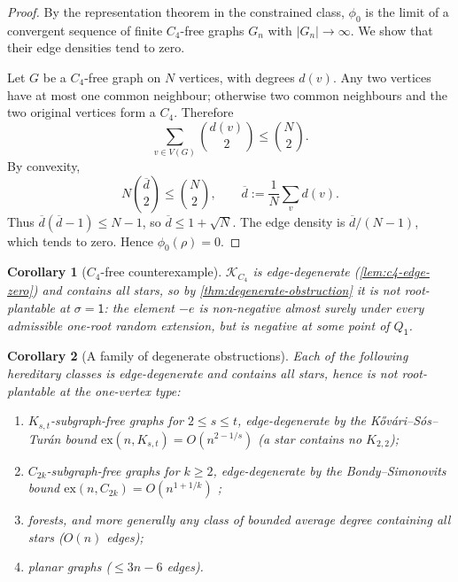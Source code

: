 \documentclass[11pt]{article}
\newtheorem{corollary}[corollary]{Corollary}
\theoremstyle{definition}
\newcommand{\K}{\mathcal{K}}
\newcommand{\vtype}{\mathsf{1}}
\begin{document}
\begin{proof}
By the representation theorem in the constrained class, $\phi_0$ is the limit
of a convergent sequence of finite $C_4$-free graphs $G_n$ with $|G_n|\to\infty$.
We show that their edge densities tend to zero.

Let $G$ be a $C_4$-free graph on $N$ vertices, with degrees $d(v)$.  Any two
vertices have at most one common neighbour; otherwise two common neighbours and
the two original vertices form a $C_4$.  Therefore
\[
  \sum_{v\in V(G)} \binom{d(v)}{2}
  \le
  \binom{N}{2}.
\]
By convexity,
\[
  N\binom{\overline d}{2}
  \le
  \binom{N}{2},
  \qquad
  \overline d:=\frac1N\sum_v d(v).
\]
Thus $\overline d(\overline d-1)\le N-1$, so
$\overline d\le 1+\sqrt N$.  The edge density is
$\overline d/(N-1)$, which tends to zero.  Hence
$\phi_0(\rho)=0$.
\end{proof}

\begin{corollary}[\texorpdfstring{$C_4$}{C4}-free counterexample]\label{cor:c4-counterexample}
$\K_{C_4}$ is edge-degenerate (\cref{lem:c4-edge-zero}) and contains all stars,
so by \cref{thm:degenerate-obstruction} it is not root-plantable at
$\sigma=\vtype$: the element $-e$ is non-negative almost surely under every admissible
one-root random extension, but is negative at some point of $Q_{\vtype}$.
\end{corollary}

\begin{corollary}[A family of degenerate obstructions]\label{cor:degenerate-family}
Each of the following hereditary classes is edge-degenerate and contains all stars,
hence is not root-plantable at the one-vertex type:
\begin{enumerate}[label=\textup{(\roman*)}, leftmargin=2.5em]
  \item $K_{s,t}$-subgraph-free graphs for $2\le s\le t$, edge-degenerate by the
        K\H{o}v\'ari--S\'os--Tur\'an bound $\mathrm{ex}(n,K_{s,t})=O(n^{2-1/s})$
        \cite{KovariSosTuran} (a star contains no $K_{2,2}$);
  \item $C_{2k}$-subgraph-free graphs for $k\ge2$, edge-degenerate by the
        Bondy--Simonovits bound $\mathrm{ex}(n,C_{2k})=O(n^{1+1/k})$
        \cite{BondySimonovits};
  \item forests, and more generally any class of bounded average degree containing
        all stars ($O(n)$ edges);
  \item planar graphs ($\le 3n-6$ edges).
\end{enumerate}
\end{corollary}
\end{document}
